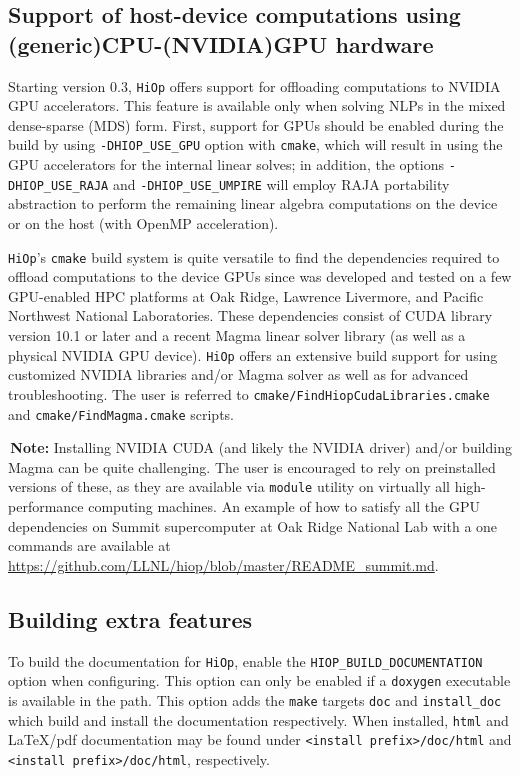 \documentclass[11pt]{article}
\newcounter{line}
\newcommand{\warningSymbol}{\raisebox{0.9\depth}{\danger}}
\newcommand{\warningcp}[1]{%
        \smallskip \noindent \textcolor{warningColorText}{\warningSymbol{}}\,\textbf{#1} %
    }
\newcommand{\Hi}{\texttt{HiOp}\xspace}
\begin{document}
\subsection{Support of host-device computations using (generic)CPU-(NVIDIA)GPU hardware}

Starting version 0.3, \Hi offers support for offloading computations to NVIDIA GPU accelerators. This feature is available only when solving NLPs in the mixed dense-sparse (MDS) form. First, support for GPUs should be enabled during the build by using \texttt{-DHIOP\_USE\_GPU} option with \texttt{cmake}, which will result in using the GPU accelerators for the internal linear solves; in addition, the options \texttt{-DHIOP\_USE\_RAJA} and \texttt{-DHIOP\_USE\_UMPIRE} will employ RAJA portability abstraction to perform the remaining linear algebra computations on the device or on the host (with OpenMP acceleration).

\Hi's \texttt{cmake} build system is quite versatile to find the dependencies required to offload computations to the device GPUs since was developed and tested on a few GPU-enabled HPC platforms at Oak Ridge, Lawrence Livermore, and Pacific Northwest National Laboratories. These dependencies consist of CUDA library version 10.1 or later and a recent Magma linear solver library (as well as a physical NVIDIA GPU device). \Hi offers an extensive build support for using customized NVIDIA libraries and/or Magma solver as well as for advanced troubleshooting. The user is referred to \texttt{cmake/FindHiopCudaLibraries.cmake} and \texttt{cmake/FindMagma.cmake} scripts.

\warningcp{Note: } Installing NVIDIA CUDA (and likely the NVIDIA driver) and/or building Magma can be quite challenging. The user is encouraged to rely on preinstalled versions of these, as they are available via \texttt{module} utility on virtually all high-performance computing machines. An example of how to satisfy all the GPU dependencies on Summit supercomputer at Oak Ridge National Lab with a one commands are available at \url{https://github.com/LLNL/hiop/blob/master/README_summit.md}.

\subsection{Building extra features}

To build the documentation for \Hi, enable the 
\texttt{HIOP\_BUILD\_DOCUMENTATION} option when configuring. This option can 
only be enabled if a \texttt{doxygen} executable is available in the path. This 
option adds the \texttt{make} targets \texttt{doc} and \texttt{install\_doc} 
which build and install the documentation respectively. When installed, 
\texttt{html} and \LaTeX{}/pdf documentation may be found under 
\texttt{<install prefix>/doc/html} and \texttt{<install prefix>/doc/html}, 
respectively.
\end{document}
